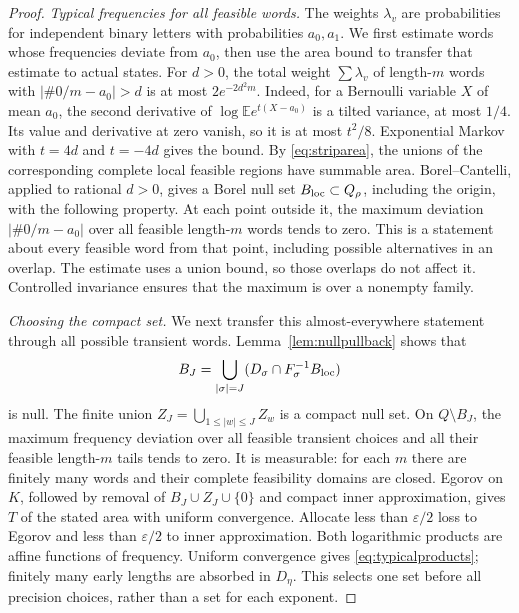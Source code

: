 \documentclass[11pt]{amsart}
\theoremstyle{definition}
\theoremstyle{remark}
\numberwithin{equation}{section}
\begin{document}
\begin{proof}
\emph{Typical frequencies for all feasible words.}
The weights $\lambda_v$ are probabilities for independent binary
letters with probabilities $a_0,a_1$. We first estimate words whose
frequencies deviate from $a_0$, then use the area bound to transfer
that estimate to actual states. For \(d>0\), the total weight \(\sum\lambda_v\) of length-\(m\)
words with \(|\#0/m-a_0|>d\) is at most \(2e^{-2d^2m}\).
Indeed, for a Bernoulli variable \(X\) of mean \(a_0\),
the second derivative of
\(\log\mathbb E e^{t(X-a_0)}\) is a tilted variance, at most
\(1/4\). Its value and derivative at zero vanish, so it is at most
\(t^2/8\). Exponential Markov with \(t=4d\) and \(t=-4d\)
gives the bound.
By \eqref{eq:striparea}, the unions of the corresponding complete
local feasible regions have summable area. Borel--Cantelli, applied to rational \(d>0\), gives a Borel null set \(B_{\rm loc}\subset Q_\rho\),
including the origin, with the following property. At each point
outside it, the maximum deviation $|\#0/m-a_0|$ over all feasible
length-$m$ words tends to zero. This is a statement about every
feasible word from that point, including possible alternatives in
an overlap. The estimate uses a union bound, so those overlaps do
not affect it. Controlled invariance ensures that the maximum is
over a nonempty family.

\smallskip
\emph{Choosing the compact set.}
We next transfer this almost-everywhere statement through all
possible transient words. Lemma~\ref{lem:nullpullback} shows that
\[
B_J=\bigcup_{|\sigma|=J}
       (D_\sigma\cap F_\sigma^{-1}B_{\rm loc})
\]
is null. The finite union
\(Z_J=\bigcup_{1\le|w|\le J}Z_w\) is a compact null set.
On \(Q\setminus B_J\), the maximum frequency deviation over all
feasible transient choices and all their feasible length-\(m\)
tails tends to zero. It is measurable: for each \(m\) there are
finitely many words and their complete feasibility domains are
closed. Egorov on \(K\), followed by removal of
\(B_J\cup Z_J\cup\{0\}\) and compact inner approximation,
gives \(T\) of the stated area with uniform convergence.
Allocate less than \(\varepsilon/2\) loss to Egorov and less than
\(\varepsilon/2\) to inner approximation.
Both logarithmic products are affine functions of frequency.
Uniform convergence gives \eqref{eq:typicalproducts}; finitely many
early lengths are absorbed in \(D_{\eta}\). This selects one set before
all precision choices, rather than a set for each exponent.


\end{proof}
\end{document}
